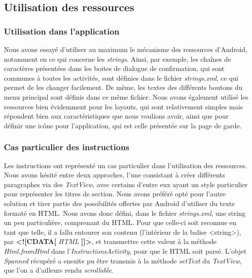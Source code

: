 \documentclass[12pt, a4paper]{article}%
\begin{document}
    \subsection{Utilisation des ressources}
    \subsubsection{Utilisation dans l'application}
    Nous avons essayé d'utiliser au maximum le mécanisme des ressources d'Android, notamment en ce qui concerne les \textit{strings}. Ainsi, par exemple, les chaînes de caractères présentées dans les boites de dialogue de confirmation, qui sont communes à toutes les activités, sont définies dans le fichier \textit{strings.xml}, ce qui permet de les changer facilement. De même, les textes des différents boutons du menu principal sont définis dans ce même fichier.
    Nous avons également utilisé les ressources bien évidemment pour les layouts, qui sont relativement simples mais répondent bien aux caractéristiques que nous voulions avoir, ainsi que pour définir une icône pour l'application, qui est celle présentée sur la page de garde.
     
     \subsubsection{Cas particulier des instructions}
     Les instructions ont représenté un cas particulier dans l'utilisation des ressources. Nous avons hésité entre deux approches, l'une consistant à créer différents paragraphes via des \textit{TextView}, avec certains d'entre eux ayant un style particulier pour représenter les titres de section. Nous avons préféré opté pour l'autre solution et tirer partie des possibilités offertes par Android d'utiliser du texte formaté en HTML. Nous avons donc défini, dans le fichier \textit{strings.xml}, une string un peu particulière, comprenant du HTML. Pour que celle-ci soit reconnue en tant que telle, il a fallu entourer son contenu (l'intérieur de la balise <string>), par \textbf{<![CDATA[} \textit{HTML} \textbf{]]>}, et transmettre cette valeur à la méthode \textit{Html.fromHtml} dans l'\textit{InstructionsActivity}, pour que le HTML soit parsé. L'objet \textit{Spanned} récupéré a ensuite pu être transmis à la méthode \textit{setText} du \textit{TextView}, que l'on a d'ailleurs rendu \textit{scrollable}.
      
\end{document}

